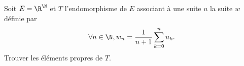 \begin{enonce}
\begin{exercise}[ID={RMS130 E660},subtitle={Mines-Ponts PSI 2019},tags={}, difficulty={0}]
  Soit $E=\R^{\N}$ et $T$ l'endomorphisme de $E$ associant à une suite $u$ la suite $w$ définie par
  \begin{equation*}
    \forall n\in\N, w_n = \frac{1}{n+1} \sum_{k=0}^n u_k.
  \end{equation*}
  Trouver les éléments propres de $T$.
\end{exercise}
\begin{solution}
\end{solution}
\end{enonce}
